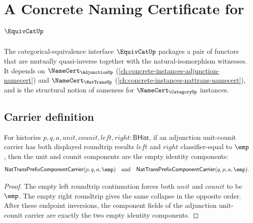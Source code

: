 \chapter{A Concrete Naming Certificate for $\EquivCatUp$}
\label{ch:concrete-instances-equivcat-namecert}

The categorical-equivalence interface $\EquivCatUp$ packages a pair of functors that are mutually quasi-inverse together with the natural-isomorphism witnesses. It depends on $\NameCert_{\AdjunctionUp}$ (\autoref{ch:concrete-instances-adjunction-namecert}) and $\NameCert_{\NatTransUp}$ (\autoref{ch:concrete-instances-nattrans-namecert}), and is the structural notion of sameness for $\NameCert_{\CategoryUp}$ instances.

\section{Carrier definition}
\label{sec:equivcat-carrier}

\begin{theorem}
\label{thm:equivcat-adjunction-empty-roundtrip-identity-components}
For histories $p,q,a,unit,counit,left,right:\mathsf{BHist}$, if an
adjunction unit-counit carrier has both displayed roundtrip results
$left$ and $right$ classifier-equal to $\emp$, then the unit and counit
components are the empty identity components:
$$
\mathsf{NatTransPrefixComponentCarrier}(p,q,a,\emp)
\quad\text{and}\quad
\mathsf{NatTransPrefixComponentCarrier}(q,p,a,\emp).
$$
\end{theorem}
\begin{proof}
The empty left roundtrip continuation forces both $unit$ and $counit$ to be
$\emp$. The empty right roundtrip gives the same collapse in the opposite
order. After these endpoint inversions, the component fields of the
adjunction unit-counit carrier are exactly the two empty identity components.
\end{proof}

